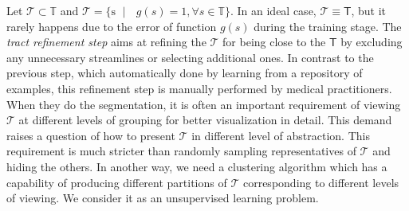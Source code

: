 Let $\mathcal{T} \subset \mathbb{T}$ and $\mathcal{T} =\{ \mbox{s  } \mid \mbox{ } g(s)=1, \forall s \in \mathbb{T} \}$. In an ideal case, $\mathcal{T} \equiv \mathsf{T}$, but it rarely happens due to the error of function $g(s)$ during the training stage.
The \emph{tract refinement step} aims at refining the $\mathcal{T}$ for being close to the $\mathsf{T}$ by excluding any unnecessary streamlines or selecting additional ones. In contrast to the previous step, which automatically done by learning from a repository of examples, this refinement step is manually performed by medical practitioners. When they do the segmentation, it is often an important requirement of viewing $\mathcal{T}$ at different levels of grouping for better visualization in detail.
This demand raises a question of how to present $\mathcal{T}$ in different level of abstraction. This requirement is much stricter than randomly sampling representatives of $\mathcal{T}$ and hiding the others. In another way, we need a clustering algorithm which has a capability of producing different partitions of $\mathcal{T}$ corresponding to different levels of viewing. We consider it as an unsupervised learning problem. 

